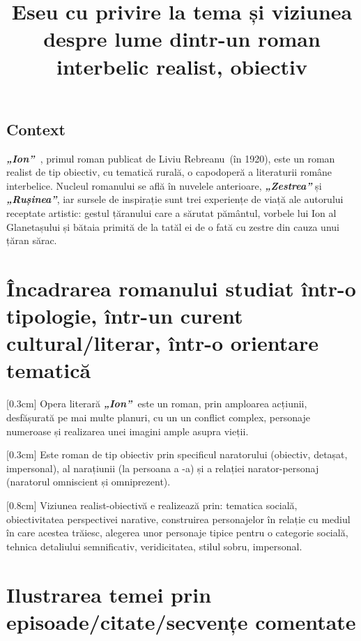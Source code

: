 \documentclass[
12pt,
a4paper
]{article}
\title{Eseu cu privire la tema și viziunea despre lume dintr-un roman interbelic realist, obiectiv}
\date{}   %
\author{} %
\newcommand{\rom}[1]{\uppercase\expandafter{\romannumeral #1\relax}} %
\newcommand{\operatitle}{\textbf{\textit{„Ion”\ }}} %
\newcommand{\operaauthor}{Liviu Rebreanu\ } %
\begin{document}
\maketitle %



\subsection{Context}

\operatitle, primul roman publicat de \operaauthor (în 1920), este un roman realist de tip obiectiv, cu tematică rurală, o capodoperă a literaturii române interbelice. Nucleul romanului se află în nuvelele anterioare, \textbf{\textit{„Zestrea”}} și \textbf{\textit{„Rușinea”}}, iar sursele de inspirație sunt trei experiențe de viață ale autorului receptate artistic: gestul țăranului care a sărutat pământul, vorbele lui Ion al Glanetașului și bătaia primită de la tatăl ei de o fată cu zestre din cauza unui țăran sărac.

\section{Încadrarea romanului studiat într-o tipologie, într-un curent cultural/literar, într-o orientare tematică}

[0.3cm]
Opera literară \operatitle este un roman, prin amploarea acțiunii, desfășurată pe mai multe planuri, cu un un conflict complex, personaje numeroase și realizarea unei imagini ample asupra vieții.

[0.3cm]
Este roman de tip obiectiv prin specificul naratorului (obiectiv, detașat, impersonal), al narațiunii (la persoana a \rom{3}-a) și a relației narator-personaj (naratorul omniscient și omniprezent).

[0.8cm]
Viziunea realist-obiectivă e realizează prin: tematica socială, obiectivitatea perspectivei narative, construirea personajelor în relație cu mediul în care acestea trăiesc, alegerea unor personaje tipice pentru o categorie socială, tehnica detaliului semnificativ, veridicitatea, stilul sobru, impersonal.

\section{Ilustrarea temei prin episoade/citate/secvențe comentate}
\end{document}
